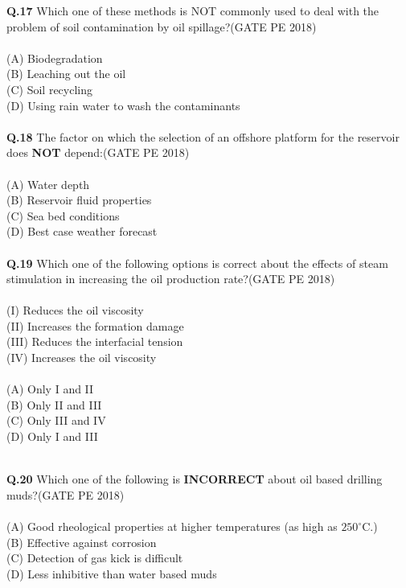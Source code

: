 \documentclass[12pt,a4paper]{article}
\begin{document}
\noindent
\textbf{Q.17} \hspace{0.5em} Which one of these methods is NOT commonly used to deal with the problem of soil
contamination by oil spillage?\hfill(GATE PE 2018)\\\\
(A) Biodegradation\\
(B) Leaching out the oil\\
(C) Soil recycling\\
(D) Using rain water to wash the contaminants\\\\

\noindent
\textbf{Q.18} \hspace{0.5em} The factor on which the selection of an offshore platform for the reservoir does \textbf{NOT}
depend:\hfill(GATE PE 2018)\\\\
(A) Water depth\\
(B) Reservoir fluid properties\\
(C) Sea bed conditions\\
(D) Best case weather forecast\\\\


\noindent
\textbf{Q.19}\hspace{0.5em} Which one of the following options is correct about the effects of steam stimulation in
increasing the oil production rate?\hfill(GATE PE 2018)\\\\
(I) Reduces the oil viscosity\\
(II) Increases the formation damage\\
(III) Reduces the interfacial tension\\
(IV) Increases the oil viscosity\\\\
(A) Only I and II\\
(B) Only II and III\\
(C) Only III and IV\\
(D) Only I and III\\\\

\pagebreak

\noindent
\textbf{Q.20}  Which one of the following is \textbf{INCORRECT} about oil based drilling muds?\hfill(GATE PE 2018)\\\\
(A) Good rheological properties at higher temperatures (as high as $250^\circ\text{C}$.)\\
(B) Effective against corrosion\\
(C) Detection of gas kick is difficult\\
(D) Less inhibitive than water based muds\\\\
\end{document}
